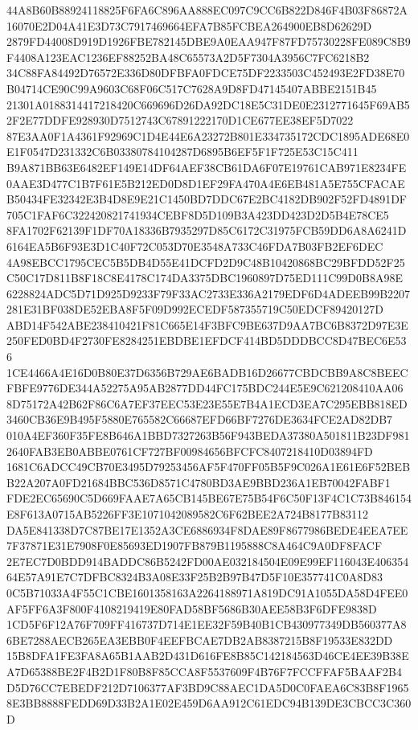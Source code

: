 \documentclass[UTF8,fontset=fandol,zihao=-4,a4paper]{ctexart}
\begin{document}
{{44A8B60B88924118825F6FA6C896AA888EC097C9CC6B822D846F4B03F86872A16070E2D04A41E3D73C7917469664EFA7B85FCBEA264900EB8D62629D
2879FD44008D919D1926FBE782145DBE9A0EAA947F87FD75730228FE089C8B9F4408A123EAC1236EF88252BA48C65573A2D5F7304A3956C7FC6218B2
34C88FA84492D76572E336D80DFBFA0FDCE75DF2233503C452493E2FD38E70B04714CE90C99A9603C68F06C517C7628A9D8FD47145407ABBE2151B45
21301A0188314417218420C669696D26DA92DC18E5C31DE0E2312771645F69AB52F2E77DDFE928930D7512743C67891222170D1CE677EE38EF5D7022
87E3AA0F1A4361F92969C1D4E44E6A23272B801E334735172CDC1895ADE68E0E1F0547D231332C6B03380784104287D6895B6EF5F1F725E53C15C411
B9A871BB63E6482EF149E14DF64AEF38CB61DA6F07E19761CAB971E8234FE0AAE3D477C1B7F61E5B212ED0D8D1EF29FA470A4E6EB481A5E755CFACAE
B50434FE32342E3B4D8E9E21C1450BD7DDC67E2BC4182DB902F52FD4891DF705C1FAF6C322420821741934CEBF8D5D109B3A423DD423D2D5B4E78CE5
8FA1702F62139F1DF70A18336B7935297D85C6172C31975FCB59DD6A8A6241D6164EA5B6F93E3D1C40F72C053D70E3548A733C46FDA7B03FB2EF6DEC
4A98EBCC1795CEC5B5DB4D55E41DCFD2D9C48B10420868BC29BFDD52F25C50C17D811B8F18C8E4178C174DA3375DBC1960897D75ED111C99D0B8A98E
6228824ADC5D71D925D9233F79F33AC2733E336A2179EDF6D4ADEEB99B2207281E31BF038DE52EBA8F5F09D992ECEDF587355719C50EDCF89420127D
ABD14F542ABE238410421F81C665E14F3BFC9BE637D9AA7BC6B8372D97E3E250FED0BD4F2730FE8284251EBDBE1EFDCF414BD5DDDBCC8D47BEC6E536
1CE4466A4E16D0B80E37D6356B729AE6BADB16D26677CBDCBB9A8C8BEECFBFE9776DE344A52275A95AB2877DD44FC175BDC244E5E9C621208410AA06
8D75172A42B62F86C6A7EF37EEC53E23E55E7B4A1ECD3EA7C295EBB818ED3460CB36E9B495F5880E765582C66687EFD66BF7276DE3634FCE2AD82DB7
010A4EF360F35FE8B646A1BBD7327263B56F943BEDA37380A501811B23DF9812640FAB3EB0ABBE0761CF727BF00984656BFCFC8407218410D03894FD
1681C6ADCC49CB70E3495D79253456AF5F470FF05B5F9C026A1E61E6F52BEBB22A207A0FD21684BBC536D8571C4780BD3AE9BBD236A1EB70042FABF1
FDE2EC65690C5D669FAAE7A65CB145BE67E75B54F6C50F13F4C1C73B846154E8F613A0715AB5226FF3E1071042089582C6F62BEE2A724B8177B83112
DA5E841338D7C87BE17E1352A3CE6886934F8DAE89F8677986BEDE4EEA7EE7F37871E31E7908F0E85693ED1907FB879B1195888C8A464C9A0DF8FACF
2E7EC7D0BDD914BADDC86B5242FD00AE032184504E09E99EF116043E40635464E57A91E7C7DFBC8324B3A08E33F25B2B97B47D5F10E357741C0A8D83
0C5B71033A4F55C1CBE1601358163A2264188971A819DC91A1055DA58D4FEE0AF5FF6A3F800F4108219419E80FAD58BF5686B30AEE58B3F6DFE9838D
1CD5F6F12A76F709FF416737D714E1EE32F59B40B1CB430977349DB560377A86BE7288AECB265EA3EBB0F4EEFBCAE7DB2AB8387215B8F19533E832DD
15B8DFA1FE3FA8A65B1AAB2D431D616FE8B85C142184563D46CE4EE39B38EA7D65388BE2F4B2D1F80B8F85CCA8F5537609F4B76F7FCCFFAF5BAAF2B4
D5D76CC7EBEDF212D7106377AF3BD9C88AEC1DA5D0C0FAEA6C83B8F19658E3BB8888FEDD69D33B2A1E02E459D6AA912C61EDC94B139DE3CBCC3C360D
}}
\end{document}
